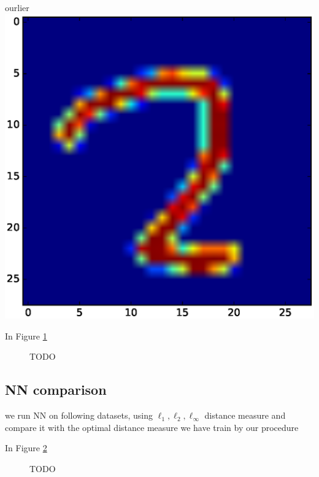 \documentclass{article}
\begin{document}
ourlier
\includegraphics[scale=.1]{fig/MNIST120.eps}






In Figure \ref{fig:AE}
\begin{figure}

\caption{TODO}
\label{fig:AE}

\end{figure}




\subsection{NN comparison}

we run NN
on following datasets, using 
$\ell_1, \ell_2, \ell_\infty$ distance measure
and compare it with the optimal distance measure we have train by our procedure


In Figure \ref{fig:NN-exp}
\begin{figure}

\caption{TODO}
\label{fig:NN-exp}


\end{figure}
\end{document}
